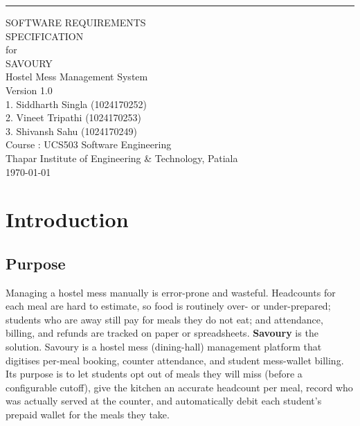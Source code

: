 \documentclass{scrreprt}
\date{}
\def\myversion{1.0 }
\begin{document}
\begin{flushright}
    \rule{16cm}{5pt}\vskip1cm
    \begin{bfseries}
        \Huge{SOFTWARE REQUIREMENTS\\ SPECIFICATION}\\
        \vspace{1.5cm}
        for\\
        \vspace{1.5cm}
        SAVOURY\\
        \large{Hostel Mess Management System}\\
        \vspace{1.5cm}
        \LARGE{Version \myversion}\\
        \vspace{1.5cm}
        1. Siddharth Singla (1024170252)\\
        2. Vineet Tripathi (1024170253)\\
        3. Shivansh Sahu (1024170249)\\
        \vspace{1cm}
        Course : UCS503 Software Engineering\\
        Thapar Institute of Engineering \& Technology, Patiala\\
        \vspace{1cm}
        \today\\
    \end{bfseries}
\end{flushright}

\tableofcontents

\chapter{Introduction}

\section{Purpose}
Managing a hostel mess manually is error-prone and wasteful. Headcounts
for each meal are hard to estimate, so food is routinely over- or
under-prepared; students who are away still pay for meals they do not
eat; and attendance, billing, and refunds are tracked on paper or
spreadsheets. \textbf{Savoury} is the solution. Savoury is a hostel mess
(dining-hall) management platform that digitises per-meal booking,
counter attendance, and student mess-wallet billing. Its purpose is to
let students opt out of meals they will miss (before a configurable
cutoff), give the kitchen an accurate headcount per meal, record who was
actually served at the counter, and automatically debit each student's
prepaid wallet for the meals they take.
\end{document}
